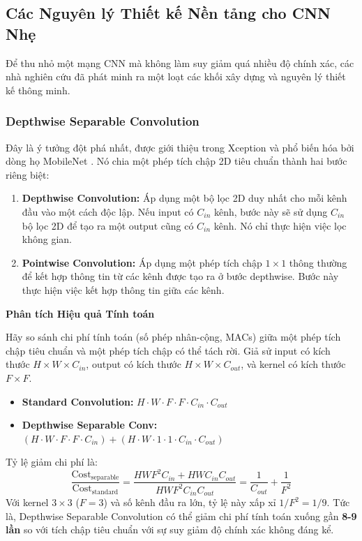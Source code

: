 \subsection{Các Nguyên lý Thiết kế Nền tảng cho CNN Nhẹ}
\label{subsec:lightweight_cnn_principles}
Để thu nhỏ một mạng CNN mà không làm suy giảm quá nhiều độ chính xác, các nhà nghiên cứu đã phát minh ra một loạt các khối xây dựng và nguyên lý thiết kế thông minh.

\subsubsection{Depthwise Separable Convolution}
\label{subsubsec:depthwise_separable_conv}
Đây là ý tưởng đột phá nhất, được giới thiệu trong Xception và phổ biến hóa bởi dòng họ MobileNet \cite{Howard2017}. Nó chia một phép tích chập 2D tiêu chuẩn thành hai bước riêng biệt:
\begin{enumerate}
	\item \textbf{Depthwise Convolution:} Áp dụng một bộ lọc 2D duy nhất cho mỗi kênh đầu vào một cách độc lập. Nếu input có $C_{in}$ kênh, bước này sẽ sử dụng $C_{in}$ bộ lọc 2D để tạo ra một output cũng có $C_{in}$ kênh. Nó chỉ thực hiện việc lọc không gian.
	\item \textbf{Pointwise Convolution:} Áp dụng một phép tích chập $1 \times 1$ thông thường để kết hợp thông tin từ các kênh được tạo ra ở bước depthwise. Bước này thực hiện việc kết hợp thông tin giữa các kênh.
\end{enumerate}

\begin{mdframed}[style=infobox]
	\textbf{Phân tích Hiệu quả Tính toán}
	
	Hãy so sánh chi phí tính toán (số phép nhân-cộng, MACs) giữa một phép tích chập tiêu chuẩn và một phép tích chập có thể tách rời. Giả sử input có kích thước $H \times W \times C_{in}$, output có kích thước $H \times W \times C_{out}$, và kernel có kích thước $F \times F$.
	\begin{itemize}
		\item \textbf{Standard Convolution:} $H \cdot W \cdot F \cdot F \cdot C_{in} \cdot C_{out}$
		\item \textbf{Depthwise Separable Conv:} $(H \cdot W \cdot F \cdot F \cdot C_{in}) + (H \cdot W \cdot 1 \cdot 1 \cdot C_{in} \cdot C_{out})$
	\end{itemize}
	Tỷ lệ giảm chi phí là:
	\begin{equation}
		\frac{\text{Cost}_{\text{separable}}}{\text{Cost}_{\text{standard}}} = \frac{H W F^2 C_{in} + H W C_{in} C_{out}}{H W F^2 C_{in} C_{out}} = \frac{1}{C_{out}} + \frac{1}{F^2}
	\end{equation}
	Với kernel $3 \times 3$ ($F=3$) và số kênh đầu ra lớn, tỷ lệ này xấp xỉ $1/F^2 = 1/9$. Tức là, Depthwise Separable Convolution có thể giảm chi phí tính toán xuống gần \textbf{8-9 lần} so với tích chập tiêu chuẩn với sự suy giảm độ chính xác không đáng kể.
\end{mdframed}

